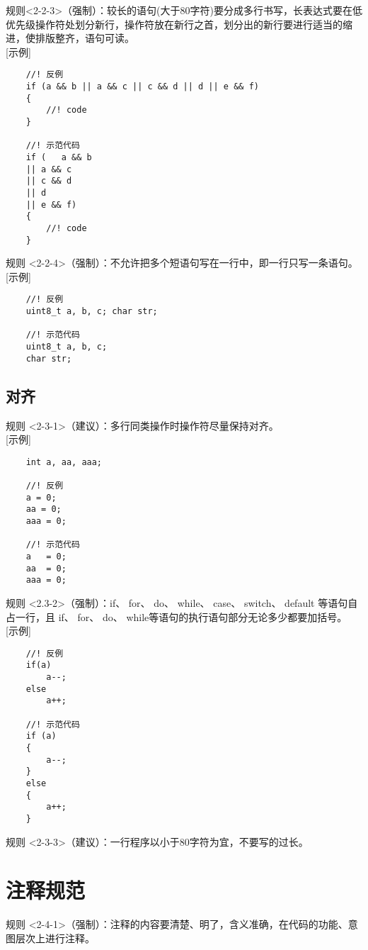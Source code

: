 \documentclass[UTF8,a4paper,12pt]{article}
\begin{document}
	规则<2-2-3>（强制）：较长的语句(大于80字符)要分成多行书写，长表达式要在低优先级操作符处划分新行，操作符放在新行之首，划分出的新行要进行适当的缩进，使排版整齐，语句可读。\\
	
	[示例]\\
	\begin{lstlisting}
	//! 反例
	if (a && b || a && c || c && d || d || e && f)
	{
		//! code
	}
	
	//! 示范代码
	if (   a && b 
	|| a && c 
	|| c && d 
	|| d 
	|| e && f)
	{
		//! code
	}
	\end{lstlisting}

	规则 <2-2-4>（强制）：不允许把多个短语句写在一行中，即一行只写一条语句。\\
	
	[示例]\\
	\begin{lstlisting}
	//! 反例
	uint8_t a, b, c; char str;
	
	//! 示范代码
	uint8_t a, b, c;
	char str;
	\end{lstlisting}

	\subsection{对齐}
	规则 <2-3-1>（建议）：多行同类操作时操作符尽量保持对齐。\\
	
	[示例]\\
	\begin{lstlisting}
	int a, aa, aaa;
	
	//! 反例
	a = 0;
	aa = 0;
	aaa = 0;
	
	//! 示范代码
	a   = 0;
	aa  = 0;
	aaa = 0;
	\end{lstlisting}
	
	规则 <2.3-2>（强制）：if、 for、 do、 while、 case、 switch、 default 等语句自占一行，且 if、 for、 do、 while等语句的执行语句部分无论多少都要加括号{}。\\
	
	[示例]\\
	\begin{lstlisting}
	//! 反例
	if(a)
		a--;
	else
		a++;
	
	//! 示范代码
	if (a)
	{
		a--;
	}
	else
	{
		a++;
	}
	\end{lstlisting}

	规则 <2-3-3>（建议）：一行程序以小于80字符为宜，不要写的过长。
	\newpage
	\section{注释规范}
	规则 <2-4-1>（强制）：注释的内容要清楚、明了，含义准确，在代码的功能、意图层次上进行注释。\\
\end{document}
